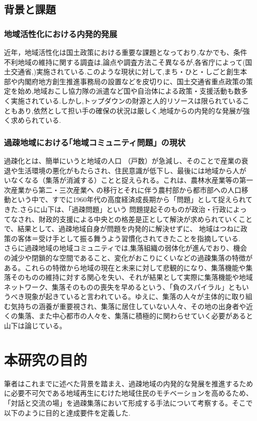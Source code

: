 \documentclass[a4paper]{jsarticle}
\begin{document}
\subsection{背景と課題}
\subsubsection{地域活性化における内発的発展}
近年，地域活性化は国土政策における重要な課題となっており,なかでも、条件不利地域の維持に関する調査は,論点や調査方法こそ異なるが,各省庁によって(国土交通省\cite{1},)実施されている.このような現状に対して,まち・ひと・しごと創生本部や内閣府地方創生推進事務局の設置などを皮切りに、国土交通省重点政策\cite{2}の策定を始め,地域おこし協力隊の派遣など国や自治体による政策・支援活動も数多く実施されている.しかし,トップダウンの財源と人的リソースは限られていることもあり,依然として担い手の確保の状況は厳しく,地域からの内発的な発展が強く求められている.
\subsubsection{過疎地域における｢地域コミュニティ問題」の現状}
過疎化とは、簡単にいうと地域の人口 （戸数）が急減し、そのことで産業の衰 退や生活環境の悪化がもたらされ、住民意識が低下し、最後には地域から人がいなくなる（集落が消滅する）ことと捉えられる。\cite{3}これは、農林水産業等の第一次産業から第二・三次産業へ の移行とそれに伴う農村部から都市部への人口移動という中で、すでに1960年代の高度経済成長期から「問題」として捉えられてきた.\cite{4}さらに山下は、「過疎問題」という 問題提起そのものが政治・行政によってなされ、財政的支援による中央との格差是正として解決が求められていくことで、結果として、過疎地域自身が問題を内発的に解決せずに、 地域はつねに政策の客体＝受け手として振る舞うよう習慣化されてきたことを指摘している.\cite{5}
　さらに過疎地域の地域コミュニティでは,集落組織の弱体化が進んでおり、機会の減少や閉鎖的な空間であること、変化がおこりにくいなどの過疎集落の特徴がある。これらの特徴から地域の現在と未来に対して悲観的になり、集落機能や集落そのものの維持に対する関心を失い、それが結果として実際に集落機能や地域ネットワーク、集落そのものの喪失を早めるという、「負のスパイラル」ともいうべき現象が起きていると言われている。\cite{6}ゆえに、集落の人々が主体的に取り組む気持ちの涵養が重要視され、集落に居住していない人々、その地の出身者や近くの集落、また中心都市の人々を、集落に積極的に関わらせていく必要があると山下は論じている。\cite{7}


\section{本研究の目的}
筆者はこれまでに述べた背景を踏まえ、過疎地域の内発的な発展を推進するために必要不可欠である地域再生にむけた地域住民のモチベーションを高めるため、「対話と交流の場」を過疎集落において形成する手法について考察する。そこで以下のように目的と達成要件を定義した.
\end{document}
